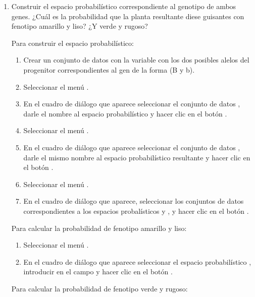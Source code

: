 \begin{enumerate}[leftmargin=*]
\begin{enumerate}
\item Construir el espacio probabilístico correspondiente al genotipo de ambos genes. 
¿Cuál es la probabilidad que la planta resultante diese guisantes con fenotipo amarillo y liso? 
¿Y verde y rugoso?
\begin{indicacion}
Para construir el espacio probabilístico: 
\begin{enumerate}
\item Crear un conjunto de datos  con la variable  con los dos posibles alelos del
progenitor correspondientes al gen de la forma (B y b).
\item Seleccionar el menú .
\item En el cuadro de diálogo que aparece seleccionar el conjunto de datos , darle el nombre
 al espacio probabilístico y hacer clic en el botón .
\item Seleccionar el menú .
\item En el cuadro de diálogo que aparece seleccionar el conjunto de datos , darle el mismo nombre al espacio
probabilístico resultante y hacer clic en el botón . 
\item Seleccionar el menú .
\item En el cuadro de diálogo que aparece, seleccionar los conjuntos de datos correspondientes a los espacios probalísticos
 y , y hacer clic en el botón .
\end{enumerate}
Para calcular la probabilidad de fenotipo amarillo y liso:
\begin{enumerate}
\item Seleccionar el menú .
\item En el cuadro de diálogo que aparece seleccionar el espacio probabilístico , introducir
 en el campo  y hacer clic en el botón .
\end{enumerate}
Para calcular la probabilidad de fenotipo verde y rugoso:
\begin{enumerate}

\end{enumerate}
\end{indicacion}
\end{enumerate}
\end{enumerate}
